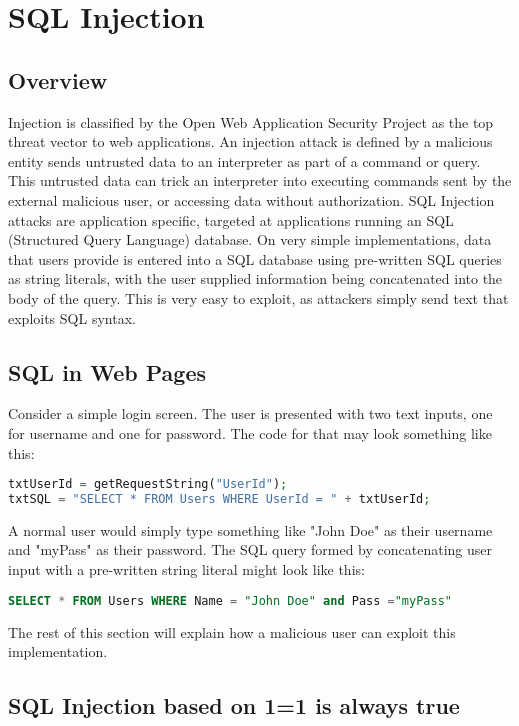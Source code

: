 \section{SQL Injection}

\subsection{Overview}
Injection is classified by the Open Web Application Security Project as the top threat vector to web applications. An injection attack is defined by a malicious entity sends untrusted data to an interpreter as part of a command or query. This untrusted data can trick an interpreter into executing commands sent by the external malicious user, or accessing data without authorization. SQL Injection attacks are application specific, targeted at applications running an SQL (Structured Query Language) database. On very simple implementations, data that users provide is entered into a SQL database using pre-written SQL queries as string literals, with the user supplied information being concatenated into the body of the query. This is very easy to exploit, as attackers simply send text that exploits SQL syntax.

\subsection{SQL in Web Pages}

Consider a simple login screen. The user is presented with two text inputs, one for username and one for password. The code for that may look something like this:

\begin{lstlisting}[language = PHP]
txtUserId = getRequestString("UserId");
txtSQL = "SELECT * FROM Users WHERE UserId = " + txtUserId;
\end{lstlisting}

A normal user would simply type something like "John Doe" as their username and "myPass" as their password. The SQL query formed by concatenating user input with a pre-written string literal might look like this:

\begin{lstlisting}[language = SQL]
SELECT * FROM Users WHERE Name = "John Doe" and Pass ="myPass"
\end{lstlisting}

The rest of this section will explain how a malicious user can exploit this implementation.

\subsection{SQL Injection based on 1=1 is always true}

